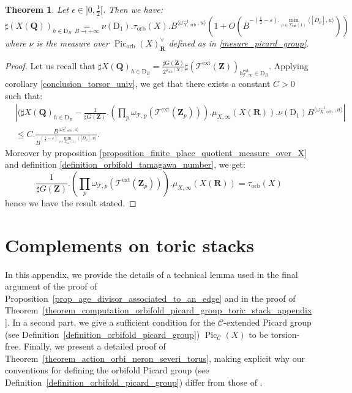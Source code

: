 \documentclass{proc-l}
\newcommand{\R}{\mathbf{R}}
\newcommand{\Z}{\mathbf{Z}}
\newcommand{\Q}{\mathbf{Q}}
\DeclareMathOperator{\Pic}{Pic}
\DeclareMathOperator{\orb}{orb}
\DeclareMathOperator{\ext}{ext}
\newcommand{\stackT}{\mathcal{T}}
\newcommand{\w}{\omega}
\newtheorem{theorem}{Theorem}[section]
\theoremstyle{definition}
\theoremstyle{remark}
\numberwithin{equation}{section}
\begin{document}
\begin{theorem}\label{theorem_final_champ_torique}
Let $\epsilon \in ]0,\frac{1}{2}[$. Then we have:
$$ \sharp ( X(\Q) )_{h \in \mathrm{D}_B} \underset{B \rightarrow +\infty}{=} \nu(\mathrm{D}_1 ) . \tau_{\orb}(X) .  B^{\langle \w_{X,\orb}^{-1},u \rangle} \left( 1 + O\left(B^{- ( \frac{1}{2} - \varepsilon).\min\limits_{\rho \in \Sigma_{\ext}(1)} \langle [D_{\rho}] , u \rangle} \right) \right)$$where $\nu$ is the measure over $\Pic_{\orb}(X)^{\vee}_{\R}$ defined as in \ref{mesure_picard_group}.
\end{theorem}

\begin{proof}
      Let us recall that $\sharp X(\Q)_{h \in \mathrm{D}_B} = \frac{\sharp G (\Z)}{2^{\rho_{\orb}(X)}} \sharp \left( \stackT^{\ext}(\Z) \right)_{h^{\ext}_{\stackT,\infty} \in \mathrm{D}_B}$. Applying corollary \ref{conclusion_torsor_univ}, we get that there exists a constant $C > 0$ such that:
      \begin{align*}
          &\left| (\sharp X(\Q)_{h \in \mathrm{D}_B}  - \frac{1}{\sharp G (\Z)} .\left( \prod\limits_p \w_{\stackT,p}(\stackT^{\ext}(\Z_p)) \right) . \mu_{X,\infty}(X(\R)). \nu(\mathrm{D}_1) B^{ \langle \w_{X,\orb}^{-1} , u \rangle } \right| \\
          & \leqslant C . \frac{B^{\langle \w_{X,\orb}^{-1} , u \rangle}}{B^{(\frac{1}{2} - \varepsilon) \min\limits_{\rho \in \Sigma_{\ext}(1)} \langle [D_{\rho}] , u \rangle }} .
      \end{align*}
       Moreover by proposition \ref{proposition_finite_place_quotient_measure_over_X} and definition \ref{definition_orbifold_tamagawa_number}, we get: $$ \frac{1}{\sharp G (\Z)} . \left( \prod\limits_p \w_{\stackT,p}(\stackT^{\ext}(\Z_p)) \right) . \mu_{X,\infty}(X(\R)) = \tau_{\orb}(X)$$hence we have the result stated.
\end{proof}

\newpage

\appendix

\section{Complements on toric stacks}




In this appendix, we provide the details of a technical lemma used in the final argument of the proof of Proposition~\ref{prop_age_divisor_associated_to_an_edge} and in the proof of Theorem~\ref{theorem_computation_orbifold_picard_group_toric_stack_appendix}. In a second part, we give a sufficient condition for the $\mathcal{C}$-extended Picard group (see Definition~\ref{definition_orbifold_picard_group}) $\Pic_{\mathcal{C}}(X)$ to be torsion-free. Finally, we present a detailed proof of Theorem~\ref{theorem_action_orbi_neron_severi_torus}, making explicit why our conventions for defining the orbifold Picard group (see Definition~\ref{definition_orbifold_picard_group}) differ from those of \cite[Definition 15]{Coates_Corti_Iritani_Tseng_miror_theorem_toric_stack}.
\end{document}
